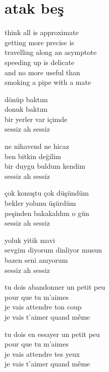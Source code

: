 \documentclass[10pt, openright, oneside]{memoir}
\theoremstyle{definition}
\begin{document}
\chapter{atak beş}
\vspace*{\fill}
\settowidth{\versewidth}{travelling along an asymptote}
\begin{cverse}
  think all is approximate \\
  getting more precise is \\
  travelling along an asymptote \\
  speeding up is delicate \\
  and no more useful than \\
  smoking a pipe with a mate \\
\end{cverse}
\vspace*{\fill}
%
\newpage
{}
\vspace*{\fill}
\settowidth{\versewidth}{sevgim diyorum dinliyor musun}
\begin{cverse}
  dönüp baktım \\
  donuk baktım \\
  bir yerler var içimde \\
  sessiz ah sessiz

  ne nihavend ne hicaz \\
  ben bitkin değilim \\
  bir duygu buldum kendim \\
  sessiz ah sessiz

  çok konuştu çok düşündüm \\
  bekler yolunu üşürdüm \\
  peşinden bakakaldım o gün \\
  sessiz ah sessiz

  yoluk yitik mavi \\
  sevgim diyorum dinliyor musun \\
  bazen seni anıyorum \\
  sessiz ah sessiz
\end{cverse}
\vspace*{\fill}
%
\newpage
{}
\vspace*{\fill}
\settowidth{\versewidth}{tu dois abandonner un petit peu}
\begin{cverse}
  tu dois abandonner un petit peu \\
  pour que tu m'aimes \\
  je vais attendre ton coup \\
  je vais t'aimer quand même

  tu dois en essayer un petit peu \\
  pour que tu m'aimes \\
  je vais attendre tes yeux \\
  je vais t'aimer quand même
\end{cverse}
\end{document}
